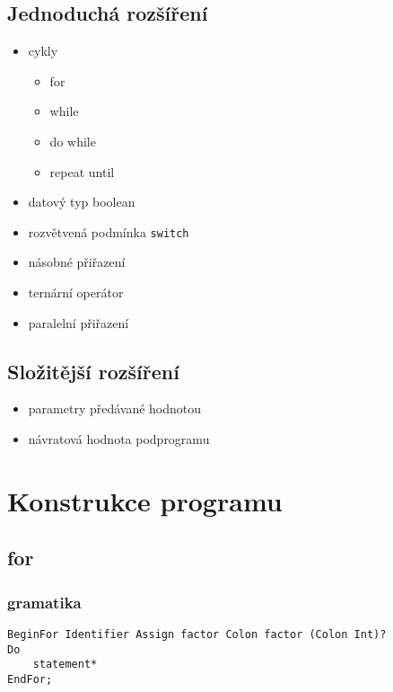 \documentclass{style}
\begin{document}
\subsection{Jednoduchá rozšíření}
\begin{itemize}
\item cykly \\
\begin{itemize}
\item for \\
\item while \\
\item do while \\
\item repeat until \\
\end{itemize}
\item datový typ boolean \\
\item rozvětvená podmínka \verb|switch| \\
\item násobné přiřazení \\
\item ternární operátor \\
\item paralelní přiřazení \\
\end{itemize}

\subsection{Složitější rozšíření}
\begin{itemize}
\item parametry předávané hodnotou \\
\item návratová hodnota podprogramu \\
\end{itemize}

\section{Konstrukce programu}
\subsection{for}
\subsubsection{gramatika}
\begin{lstlisting}
BeginFor Identifier Assign factor Colon factor (Colon Int)? 
Do 
	statement* 
EndFor;
\end{lstlisting}
\end{document}
